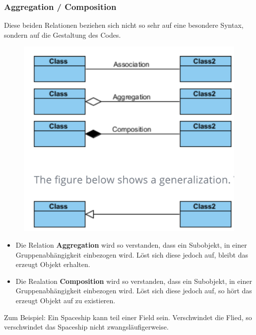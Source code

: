\subsubsection{Aggregation / Composition}
Diese beiden Relationen beziehen sich nicht so sehr auf eine besondere Syntax, sondern auf die Gestaltung des Codes.
\begin{figure}[H]
	\centering
	\includegraphics[scale = 0.3]{attachment/chapter_2/Scc014}
	\caption{}
	\label{fig:Scc014}
\end{figure}
\begin{itemize}
	\item Die Relation \textbf{Aggregation} wird so verstanden, dass ein Subobjekt, in einer Gruppenabhängigkeit einbezogen wird. Löst sich diese jedoch auf, bleibt das erzeugt Objekt erhalten.
	\item Die Realation \textbf{Composition} wird so verstanden, dass ein Subobjekt, in einer Gruppenabhängigkeit einbezogen wird. Löst sich diese jedoch auf, so hört das erzeugt Objekt auf zu existieren. 
\end{itemize} 
Zum Beispiel: Ein Spaceship kann teil einer Field sein. Verschwindet die Flied, so verschwindet das Spaceship nicht zwangsläufigerweise. 
